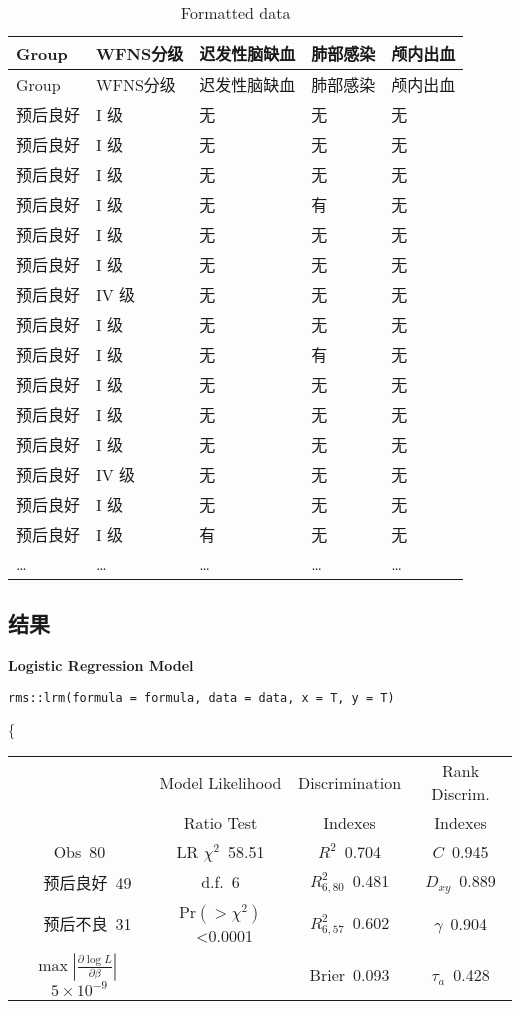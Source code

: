 \documentclass[
]{article}
\begin{document}
\begin{longtable}[]{@{}lllll@{}}
\caption{\label{tab:Formatted-data}Formatted data}\tabularnewline
\toprule
Group & WFNS分级 & 迟发性脑缺血 & 肺部感染 & 颅内出血\tabularnewline
\midrule
\endfirsthead
\toprule
Group & WFNS分级 & 迟发性脑缺血 & 肺部感染 & 颅内出血\tabularnewline
\midrule
\endhead
预后良好 & I 级 & 无 & 无 & 无\tabularnewline
预后良好 & I 级 & 无 & 无 & 无\tabularnewline
预后良好 & I 级 & 无 & 无 & 无\tabularnewline
预后良好 & I 级 & 无 & 有 & 无\tabularnewline
预后良好 & I 级 & 无 & 无 & 无\tabularnewline
预后良好 & I 级 & 无 & 无 & 无\tabularnewline
预后良好 & IV 级 & 无 & 无 & 无\tabularnewline
预后良好 & I 级 & 无 & 无 & 无\tabularnewline
预后良好 & I 级 & 无 & 有 & 无\tabularnewline
预后良好 & I 级 & 无 & 无 & 无\tabularnewline
预后良好 & I 级 & 无 & 无 & 无\tabularnewline
预后良好 & I 级 & 无 & 无 & 无\tabularnewline
预后良好 & IV 级 & 无 & 无 & 无\tabularnewline
预后良好 & I 级 & 无 & 无 & 无\tabularnewline
预后良好 & I 级 & 有 & 无 & 无\tabularnewline
\ldots{} & \ldots{} & \ldots{} & \ldots{} & \ldots{}\tabularnewline
\bottomrule
\end{longtable}

\hypertarget{res}{%
\subsection{结果}\label{res}}

\noindent \textbf{Logistic Regression Model}

\begin{verbatim}
rms::lrm(formula = formula, data = data, x = T, y = T)
\end{verbatim}

\{\selectfont 

\begin{center}\begin{tabular}{|c|c|c|c|}\hline
&Model Likelihood&Discrimination&Rank Discrim.\\
&Ratio Test&Indexes&Indexes\\\hline
Obs~\hfill 80&LR $\chi^{2}$~\hfill 58.51&$R^{2}$~\hfill 0.704&$C$~\hfill 0.945\\
~~预后良好~\hfill 49&d.f.~\hfill 6&$R^{2}_{6,80}$~\hfill 0.481&$D_{xy}$~\hfill 0.889\\
~~预后不良~\hfill 31&Pr$(>\chi^{2})$~\hfill \textless 0.0001&$R^{2}_{6,57}$~\hfill 0.602&$\gamma$~\hfill 0.904\\
$\max|\frac{\partial\log L}{\partial \beta}|$~\hfill $5\!\times\!10^{-9}$&&Brier~\hfill 0.093&$\tau_{a}$~\hfill 0.428\\
\hline
\end{tabular}
\end{center}
\end{document}
